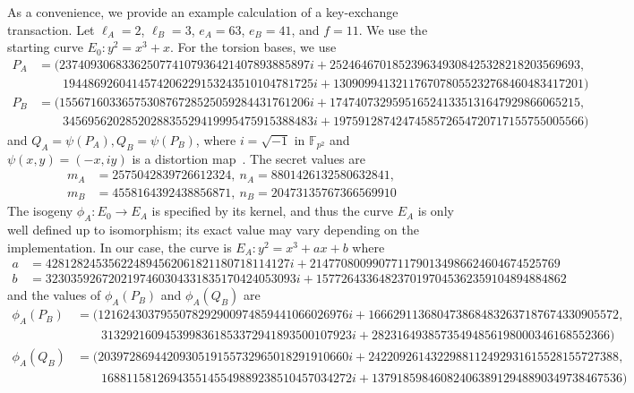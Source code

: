 \documentclass[jmc]{degruyter-journal-a}
\theoremstyle{definition}
\newcommand{\FF}{{\mathbb{F}}}
\begin{document}
As a convenience, we provide an example calculation of a key-exchange
transaction. Let $\ell_A = 2$, $\ell_B = 3$, $e_A = 63$, $e_B = 41$,
and $f = 11$. We use the starting curve $E_0: y^2 = x^3 + x$. For the
torsion bases, we use {\tiny
\begin{align*}
P_A &= (2374093068336250774107936421407893885897 i + 
    2524646701852396349308425328218203569693, \\
    & \qquad 1944869260414574206229153243510104781725 i + 
    1309099413211767078055232768460483417201) \\
P_B &= (1556716033657530876728525059284431761206 i + 
    1747407329595165241335131647929866065215, \\
    & \qquad 3456956202852028835529419995475915388483 i + 
    1975912874247458572654720717155755005566)
\end{align*}
}
{\!\!\!} and $Q_A = \psi(P_A), Q_B = \psi(P_B)$, where $i = \sqrt{-1}$ in
$\FF_{p^2}$ and $\psi(x,y) = (-x,iy)$ is a distortion map~\cite{joux}. The
secret values are
{\tiny
\begin{align*}
m_A &= 2575042839726612324,\ 
n_A = 8801426132580632841,\  \\
m_B &= 4558164392438856871,\ 
n_B = 20473135767366569910 
\end{align*}
}
The isogeny $\phi_A\colon E_0 \to E_A$ is specified by its kernel, and
thus the curve $E_A$ is only well defined up to isomorphism; its exact
value may vary depending on the implementation. In our case, the curve
is $E_A: y^2 = x^3 + ax + b$ where
{\tiny
\begin{align*}
a &= 428128245356224894562061821180718114127 i + 2147708009907711790134986624604674525769 \\
b &= 3230359267202197460304331835170424053093 i + 1577264336482370197045362359104894884862
\end{align*}
}
and the values of $\phi_A(P_B)$ and $\phi_A(Q_B)$ are
{\tiny
\begin{align*}
\phi_A(P_B) &= 
(1216243037955078292900974859441066026976 i + 
    1666291136804738684832637187674330905572, \\
    & \qquad 3132921609453998361853372941893500107923 i + 
    28231649385735494856198000346168552366)
\\
\phi_A(Q_B) &=
(2039728694420930519155732965018291910660 i + 
    2422092614322988112492931615528155727388, \\
    & \qquad 1688115812694355145549889238510457034272 i + 
    1379185984608240638912948890349738467536)
\end{align*}
}
\end{document}
